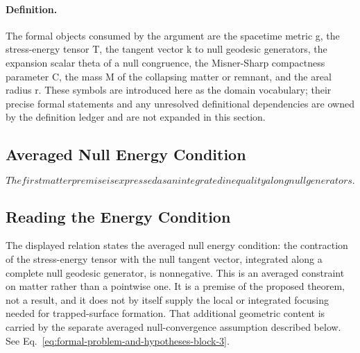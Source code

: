 \documentclass[conference]{IEEEtran}
\begin{document}
\paragraph{Definition.} The formal objects consumed by the argument are the spacetime metric g, the stress-energy tensor T, the tangent vector k to null geodesic generators, the expansion scalar theta of a null congruence, the Misner-Sharp compactness parameter C, the mass M of the collapsing matter or remnant, and the areal radius r. These symbols are introduced here as the domain vocabulary; their precise formal statements and any unresolved definitional dependencies are owned by the definition ledger and are not expanded in this section.

\subsection{Averaged Null Energy Condition}
\begin{equation}
The first matter premise is expressed as an integrated inequality along null generators.
\label{eq:formal-problem-and-hypotheses-block-3}
\end{equation}

\subsection{Reading the Energy Condition}
The displayed relation states the averaged null energy condition: the contraction of the stress-energy tensor with the null tangent vector, integrated along a complete null geodesic generator, is nonnegative. This is an averaged constraint on matter rather than a pointwise one. It is a premise of the proposed theorem, not a result, and it does not by itself supply the local or integrated focusing needed for trapped-surface formation. That additional geometric content is carried by the separate averaged null-convergence assumption described below. See Eq.~\eqref{eq:formal-problem-and-hypotheses-block-3}.
\end{document}
